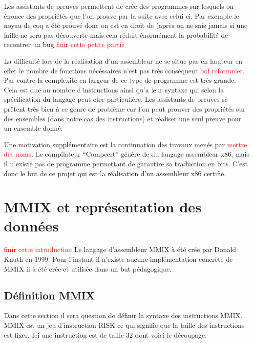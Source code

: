 \documentclass {article}
\theoremstyle{definition}
\theoremstyle{remark}
\newcommand{\todo}[1]{\textcolor{red}{#1}}
\begin{document}
Les assistants de preuves permettent de crée des programmes sur lesquels on énonce des propriétés que l'on prouve par
la suite avec celui ci. 
Par exemple le noyau de coq a été prouvé donc on est en droit de (après on ne sais jamais si une faille ne sera pas découverte
mais cela réduit énormément la probabilité de recontrer un bug \todo{finir cette petite partie}

La difficulté lors de la réalisation d'un assembleur ne se situe pas en hauteur en effet le nombre de
fonctions nécéssaires n'est pas très conséquent \todo{bof reformuler}. Par contre la complexité en largeur
de ce type de programme est très grande. Cela est due au nombre d'instructions ainsi qu'a leur syntaxe qui selon
la spécification du langage peut etre particulière.
Les assistants de preuves se prêtent très bien à ce genre de problème car l'on peut prouver des
propriétés sur des ensembles (dans notre cas des instructions) et réaliser une seul preuve pour
un ensemble donné.

Une motivation supplémentaire est la continuation des travaux menés par \todo{mettre des noms}.
Le compilateur ``Compcert'' génère de du langage assembleur x86, mais il n'existe pas
de programme permettant de garantire sa traduction en bits.
C'est donc le but de ce projet qui est la réalisation d'un assembleur x86 certifié.



\section{MMIX et représentation des données}
\label{partieMMIX}

\todo{finir cette introduction}
Le langage d'assembleur MMIX à été crée par Donald Knuth en 1999.
Pour l'instant il n'existe aucune implémentation concrète de MMIX il
à été crée et utilisée dans un but pédagogique.







\subsection{Définition MMIX}

Dans cette section il sera question de définir la syntaxe des instructions MMIX.
MMIX est un jeu d'instruction RISK ce qui signifie que la taille des instructions
est fixer. Ici une instruction est de taille 32 dont voici le découpage.
\end{document}
